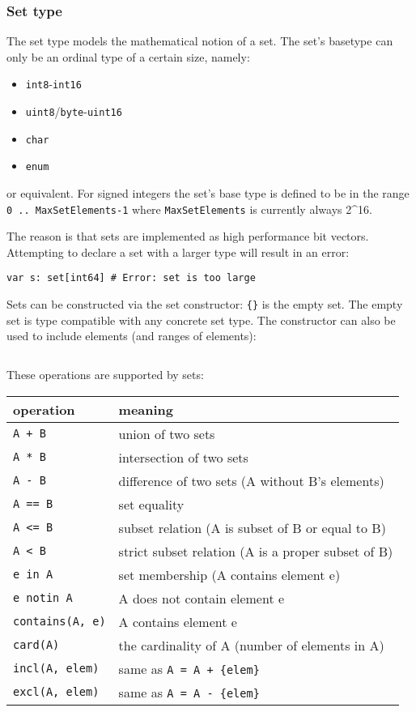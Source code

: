 \hypertarget{set-type}{%
\subsubsection{Set type}\label{set-type}}

The set type models the mathematical notion of a set. The set's basetype
can only be an ordinal type of a certain size, namely:

\begin{itemize}
\tightlist
\item
  \texttt{int8}-\texttt{int16}
\item
  \texttt{uint8}/\texttt{byte}-\texttt{uint16}
\item
  \texttt{char}
\item
  \texttt{enum}
\end{itemize}

or equivalent. For signed integers the set's base type is defined to be
in the range \texttt{0\ ..\ MaxSetElements-1} where
\texttt{MaxSetElements} is currently always 2\^{}16.

The reason is that sets are implemented as high performance bit vectors.
Attempting to declare a set with a larger type will result in an error:

\begin{verbatim}
var s: set[int64] # Error: set is too large
\end{verbatim}

Sets can be constructed via the set constructor: \texttt{\{\}} is the
empty set. The empty set is type compatible with any concrete set type.
The constructor can also be used to include elements (and ranges of
elements):

\begin{verbatim}
\end{verbatim}

These operations are supported by sets:

\begin{longtable}[]{@{}ll@{}}
\toprule
operation & meaning\tabularnewline
\midrule
\endhead
\texttt{A\ +\ B} & union of two sets\tabularnewline
\texttt{A\ *\ B} & intersection of two sets\tabularnewline
\texttt{A\ -\ B} & difference of two sets (A without B's
elements)\tabularnewline
\texttt{A\ ==\ B} & set equality\tabularnewline
\texttt{A\ \textless{}=\ B} & subset relation (A is subset of B or equal
to B)\tabularnewline
\texttt{A\ \textless{}\ B} & strict subset relation (A is a proper
subset of B)\tabularnewline
\texttt{e\ in\ A} & set membership (A contains element e)\tabularnewline
\texttt{e\ notin\ A} & A does not contain element e\tabularnewline
\texttt{contains(A,\ e)} & A contains element e\tabularnewline
\texttt{card(A)} & the cardinality of A (number of elements in
A)\tabularnewline
\texttt{incl(A,\ elem)} & same as
\texttt{A\ =\ A\ +\ \{elem\}}\tabularnewline
\texttt{excl(A,\ elem)} & same as
\texttt{A\ =\ A\ -\ \{elem\}}\tabularnewline
\bottomrule
\end{longtable}

